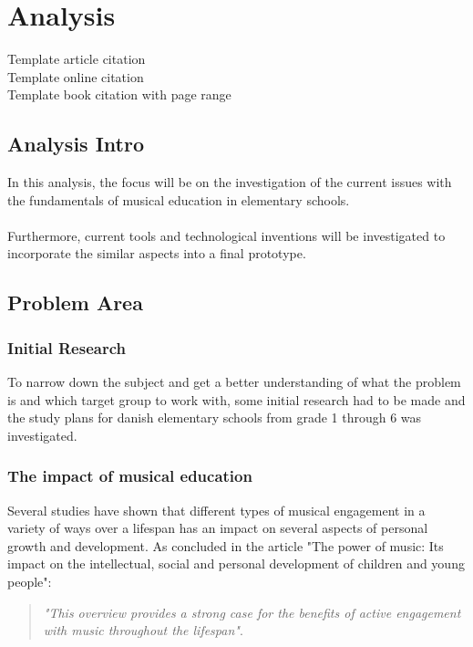 \chapter{Analysis}
Template article citation\cite{articleTemplate}\\
Template online citation\cite{onlineTemplate}\\
Template book citation with page range\cite[p.~442-444]{interactionDesign}

\section{Analysis Intro}
In this analysis, the focus will be on the investigation of the current issues with the fundamentals of musical education in elementary schools.\\
\\
Furthermore, current tools and technological inventions will be investigated to incorporate the similar aspects into a final prototype.

\section{Problem Area}

	\subsection{Initial Research}
	To narrow down the subject and get a better understanding of what the problem is and which target group to work with, some initial research had to be made and the study plans for danish elementary schools from grade 1 through 6 was investigated.\\
	
	\subsection{The impact of musical education}
	Several studies have shown that different types of musical engagement in a variety of ways over a lifespan has an impact on several aspects of personal growth and development. As concluded in the article "The power of music: Its impact on the intellectual, social and personal development of children and young people":\\
	
	\begin{quote}
		\textit{"This overview provides a strong case for the benefits of active engagement with music throughout the lifespan"}\cite{powerOfMusic}\label{quote:powerOfMusic}.\\
	\end{quote}
	
